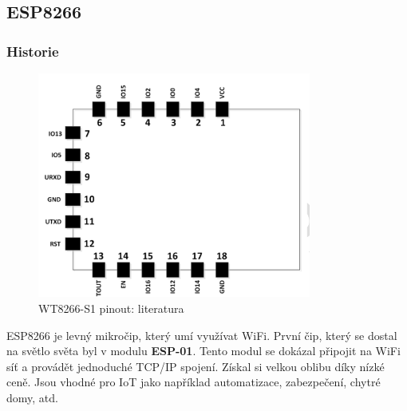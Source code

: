 \documentclass[a4paper, 12pt]{report}
\begin{document}
    \subsection{ESP8266}\label{subsec:esp8266}

    \subsubsection{Historie}
    \begin{figure}[h!]
        \centering
        \includegraphics[width=9cm]{images/ESP8266_piny}
        \caption{WT8266-S1 pinout: literatura~\cite{WT8266}}
        \label{fig:esp8266_piny}
    \end{figure}
    ESP8266 je levný mikročip, který umí využívat WiFi. První čip, který se dostal na světlo světa byl v modulu \textbf{ESP-01}.
    Tento modul se dokázal připojit na WiFi síť a provádět jednoduché TCP/IP spojení. Získal si velkou oblibu díky nízké ceně.
    Jsou vhodné pro IoT jako například automatizace, zabezpečení, chytré domy, atd.
\end{document}
